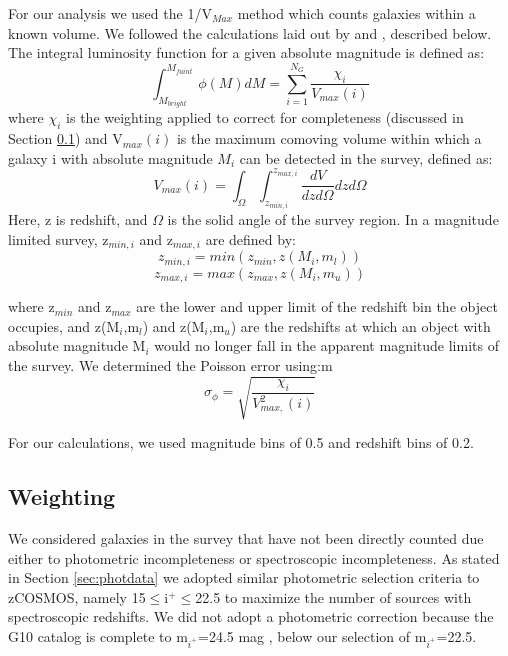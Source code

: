 \documentclass[manuscript]{aastex61}
\begin{document}
For our analysis we used the 1/V$_{Max}$ method \citep{1968ApJ...151..393S} which counts galaxies within a known volume. We followed the calculations laid out by \citet{2006ApJ...647..853W} and \citet{2005A&A...439..863I}, described below. The integral luminosity function for a given absolute magnitude is defined as: 
\begin{equation}
\int_{M_{bright}}^{M_{faint}}\phi(M)dM=\sum_{i=1}^{N_{G}}\frac{\chi_{i}}{V_{max}(i)}
\label{eq:equation 7}
\end{equation}
where $\chi_{i}$ is the weighting applied to correct for completeness (discussed in Section \ref{sec:Weighting}) and V$_{max}(i)$ is the maximum comoving volume within which a galaxy i with absolute magnitude $M_{i}$ can be detected in the survey, defined as:
\begin{equation}
V_{max}(i)=\int_{\Omega}\int_{z_{min,i}}^{z_{max,i}}\frac{dV}{dz d\Omega}dz d\Omega
\label{eq:equation 8}
\end{equation}
Here, z is redshift, and $\Omega$ is the solid angle of the survey region. In a magnitude limited survey, z$_{min,i}$ and z$_{max,i}$ are defined by:
\begin{equation}
z_{min,i}=min(z_{min},z(M_{i},m_{l}))
\label{eq:equation 9}
\end{equation}
\begin{equation}
z_{max,i}=max(z_{max},z(M_{i},m_{u}))
\label{eq:equation 10}
\end{equation}

where z$_{min}$ and z$_{max}$ are the lower and upper limit of the redshift bin the object occupies, and z(M$_{i}$,m$_{l}$) and z(M$_{i}$,m$_{u}$) are the redshifts at which an object with absolute magnitude M$_{i}$ would no longer fall in the apparent magnitude limits of the survey. We determined the Poisson error using:m 
\begin{equation}
\sigma_{\phi}=\sqrt{\frac{\chi_{i}}{V_{max,}^{2}(i)}}
\label{eq:equation 11}
\end{equation}

For our calculations, we used magnitude bins of 0.5 and redshift bins of 0.2. 
\subsection{Weighting}\label{sec:Weighting}
We considered galaxies in the survey that have not been directly counted due either to photometric incompleteness or spectroscopic incompleteness. As stated in Section \ref{sec:photdata} we adopted similar photometric selection criteria to zCOSMOS, namely 15$\leq$i$^{+}\leq$22.5 to maximize the number of sources with spectroscopic redshifts. We did not adopt a photometric correction because the G10 catalog is complete to m$_{i^{+}}$=24.5 mag \citet{2017MNRAS.464.1569A}, below our selection of m$_{i^{+}}$=22.5.  
\end{document}
